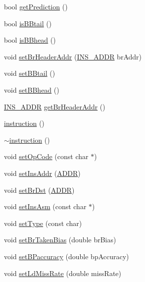 \begin{DoxyCompactItemize}
\item 
bool \hyperlink{classinstruction_a02c4c1da37bc53bbe65fb85ccfd3ee52}{getPrediction} ()
\item 
bool \hyperlink{classinstruction_ab72dc8a4eae39e0ae3f7317fa88d66d7}{isBBtail} ()
\item 
bool \hyperlink{classinstruction_a62b80293d12bff3fca6bb0e052ab710c}{isBBhead} ()
\item 
void \hyperlink{classinstruction_a19971c1a97eb166b20b04085842f5fef}{setBrHeaderAddr} (\hyperlink{global_2global_8h_a1d35a3946fb219a5e6a04417d1930e40}{INS\_\-ADDR} brAddr)
\item 
void \hyperlink{classinstruction_ae47d1153ed4be0ce3ba8e3c5b007e331}{setBBtail} ()
\item 
void \hyperlink{classinstruction_a85be485a728d6539088c71dab3cdec0d}{setBBhead} ()
\item 
\hyperlink{global_2global_8h_a1d35a3946fb219a5e6a04417d1930e40}{INS\_\-ADDR} \hyperlink{classinstruction_a87aa9628956122d77e3b1f6144f7e6e9}{getBrHeaderAddr} ()
\item 
\hyperlink{classinstruction_a2e0bfed549166dbfa1ce77ec084ea310}{instruction} ()
\item 
\hyperlink{classinstruction_a4f9c54b6376cf77565179728fa6f68fa}{$\sim$instruction} ()
\item 
void \hyperlink{classinstruction_a7a4adbec8d2e9a2cb6090168530e336c}{setOpCode} (const char $\ast$)
\item 
void \hyperlink{classinstruction_affb2525016712f3bac93120d4d81961d}{setInsAddr} (\hyperlink{binaryTranslator_2global_8h_aa4557b0650cb21e57e3e4623410832c6}{ADDR})
\item 
void \hyperlink{classinstruction_aeeee9fa55e89a75f59d160c0aad34a52}{setBrDst} (\hyperlink{binaryTranslator_2global_8h_aa4557b0650cb21e57e3e4623410832c6}{ADDR})
\item 
void \hyperlink{classinstruction_ae28df36b635c5359fa48a6476eebc425}{setInsAsm} (const char $\ast$)
\item 
void \hyperlink{classinstruction_aa6ff7d5323483cf18c10687ed8c1dc73}{setType} (const char)
\item 
void \hyperlink{classinstruction_aabc818127836c8403b9c691985ca6d14}{setBrTakenBias} (double brBias)
\item 
void \hyperlink{classinstruction_a613fd5dcaabf9a68596545679b17ffd8}{setBPaccuracy} (double bpAccuracy)
\item 
void \hyperlink{classinstruction_a5052a04bf5db0d0e1519eb54f343bdc6}{setLdMissRate} (double missRate)

\end{DoxyCompactItemize}
